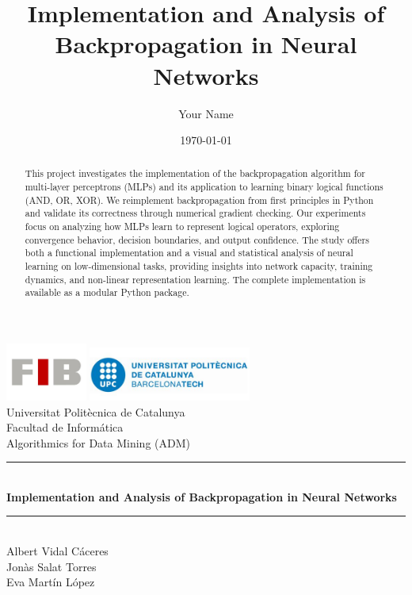 \documentclass[11pt,a4paper]{article}
\title{Implementation and Analysis of Backpropagation in Neural Networks}
\author{Your Name}
\date{\today}
\newcommand{\HRule}{\rule{\linewidth}{0.5mm}}
\begin{document}
\begin{titlepage}

\sffamily

\begin{center}

\includegraphics[width=0.2\textwidth]{figures/FIB.jpg}
\hfill
\includegraphics[width=0.4\textwidth]{figures/UPC.jpg}  
\\[4cm]

{\Large Universitat Politècnica de Catalunya}\\[0.5cm]
{\Large Facultad de Informática}\\[0.5cm]
{\Large Algorithmics for Data Mining (ADM)}\\[2cm]

\HRule \\[0.4cm]
{ \huge \bfseries Implementation and Analysis of Backpropagation in Neural Networks}\\[0.4cm]
\HRule \\[1.5cm]

{\Large Albert Vidal Cáceres}\\[0.5cm]
{\Large Jonàs Salat Torres}\\[0.5cm]
{\Large Eva Martín López}\\[0.5cm]

\vfill
\end{center}
\end{titlepage}

\tableofcontents
\newpage

\begin{abstract}
This project investigates the implementation of the backpropagation algorithm for multi-layer perceptrons (MLPs) and its application to learning binary logical functions (AND, OR, XOR). We reimplement backpropagation from first principles in Python and validate its correctness through numerical gradient checking. Our experiments focus on analyzing how MLPs learn to represent logical operators, exploring convergence behavior, decision boundaries, and output confidence. The study offers both a functional implementation and a visual and statistical analysis of neural learning on low-dimensional tasks, providing insights into network capacity, training dynamics, and non-linear representation learning. The complete implementation is available as a modular Python package.
\end{abstract}
\end{document}
